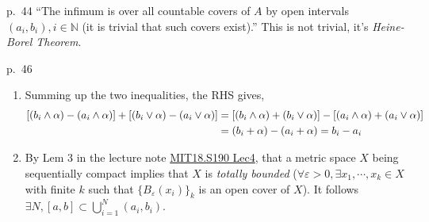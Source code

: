 \begin{note}{p.~44}
    ``The infimum is over all countable covers of $A$ by open intervals $(a_i,b_i),i\in\mathbb{N}$ (it is trivial that such covers exist).'' This is not trivial, it's \emph{Heine-Borel Theorem}.
\end{note}

\begin{note}{p.~46}
\begin{enumerate}
    \item Summing up the two inequalities, the RHS gives,
    \[
    \begin{aligned}
        \relax[(b_i\land \alpha)-(a_i\land \alpha)]+[(b_i\lor \alpha)-(a_i\lor \alpha)]&=[(b_i\land \alpha)+(b_i\lor \alpha)]-[(a_i\land \alpha)+(a_i\lor \alpha)]\\
        &=(b_i+\alpha)-(a_i+\alpha)=b_i-a_i
    \end{aligned}
    \]
    \item By Lem 3 in the lecture note \href{https://ocw.mit.edu/courses/18-s190-introduction-to-metric-spaces-january-iap-2023/mit18_s190iap23_lec4.pdf}{MIT18.S190 Lec4}, that a metric space $X$ being sequentially compact implies that $X$ is \emph{totally bounded} ($\forall \varepsilon>0,\exists x_1,\cdots,x_k\in X$ with finite $k$ such that $\{B_{\varepsilon}(x_i)\}_k$ is an open cover of $X$). It follows $\exists N, [a,b]\subset \bigcup_{i=1}^N (a_i,b_i)$.
\end{enumerate}
\end{note}

